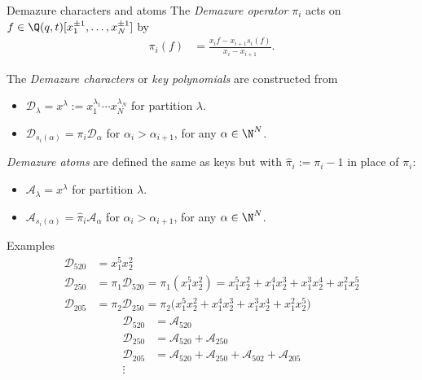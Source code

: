 \documentclass[dvipsnames]{beamer}
\newcommand{\Acal}{{\mathcal A}}
\newcommand{\Dcal}{{\mathcal D}}
\theoremstyle{definition}
\newcounter{c}
\begin{document}
\begin{frame}{Demazure characters and atoms}
  The \emph{Demazure operator} $\pi_i$
  acts on $f \in \Q(q,t)[x_1^{\pm 1}, \dots, x_N^{\pm 1}]$ by
  \vspace{-1mm}
  \begin{align*}
  \pi_i(f) &= \frac{x_if-x_{i+1}s_i(f)}{x_i-x_{i+1}}.
  \end{align*}\pause

  The \emph{Demazure characters} or \emph{key polynomials} are
  constructed from
  \begin{itemize}
  \item  $\Dcal_{\lambda} = x^\lambda := x_1^{\lambda_1}\cdots x_N^{\lambda_N}$ for partition  $\lambda$.
  \item $\Dcal_{s_i(\alpha)} = \pi_i \Dcal_{\alpha}$ for  $\alpha_i > \alpha_{i+1}$, for any  $\alpha \in \N^N$.

  \end{itemize}\pause
\emph{Demazure atoms} are defined the same as keys but with
$\hat{\pi}_i := \pi_i-1$ in place of  $\pi_i$:
\begin{itemize}
\item \(\Acal_\lambda = x^\lambda\) for partition \(\lambda\).
\item \(\Acal_{s_i(\alpha)} = \hat{\pi}_i \Acal_\alpha\) for \(\alpha_i >
  \alpha_{i+1}\), for any \(\alpha \in \N^N\).
\end{itemize}
\vspace{5mm}
\end{frame}
\begin{frame}{Examples}
  \begin{align*}
\Dcal_{520} & = x_1^5x_2^2  \\[.8mm] 
\Dcal_{250} & = \pi_{1}\Dcal_{520}=\pi_1(x_1^5x_2^2) = x_1^5x_2^2 + x_1^4 x_2^3 + x_1^3 x_2^4 + x_1^2x_2^5 \\[.8mm]
\Dcal_{205} & = \pi_2 \Dcal_{250} = \pi_2 \big(x_1^5x_2^2 + x_1^4 x_2^3 + x_1^3 x_2^4 + x_1^2x_2^5\big)
\end{align*}
\pause
\begin{align*}
  \Dcal_{520} & = \Acal_{520}\\
  \Dcal_{250} & = \Acal_{520} + \Acal_{250}\\
  \Dcal_{205} & = \Acal_{520} + \Acal_{250} + \Acal_{502} +
                \Acal_{205}\\
  \vdots
\end{align*}

\end{frame}
\end{document}
